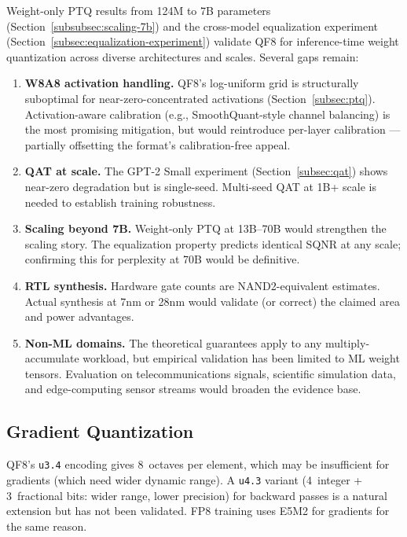 \documentclass[11pt,letterpaper]{article}
\theoremstyle{definition}
\theoremstyle{remark}
\begin{document}
Weight-only PTQ results from 124M to 7B parameters
(Section~\ref{subsubsec:scaling-7b}) and the cross-model equalization experiment
(Section~\ref{subsec:equalization-experiment}) validate QF8 for inference-time
weight quantization across diverse architectures and scales.
Several gaps remain:
\begin{enumerate}[leftmargin=2em]
  \item \textbf{W8A8 activation handling.}
    QF8's log-uniform grid is structurally suboptimal for near-zero-concentrated
    activations (Section~\ref{subsec:ptq}).
    Activation-aware calibration (e.g., SmoothQuant-style channel balancing) is
    the most promising mitigation, but would reintroduce per-layer
    calibration --- partially offsetting the format's calibration-free appeal.
  \item \textbf{QAT at scale.}
    The GPT-2 Small experiment (Section~\ref{subsec:qat}) shows near-zero
    degradation but is single-seed.
    Multi-seed QAT at 1B+ scale is needed to establish training robustness.
  \item \textbf{Scaling beyond 7B.}
    Weight-only PTQ at 13B--70B would strengthen the scaling story.
    The equalization property predicts identical SQNR at any scale; confirming
    this for perplexity at 70B would be definitive.
  \item \textbf{RTL synthesis.}
    Hardware gate counts are NAND2-equivalent estimates.
    Actual synthesis at 7nm or 28nm would validate (or correct) the claimed area
    and power advantages.
  \item \textbf{Non-ML domains.}
    The theoretical guarantees apply to any multiply-accumulate workload, but
    empirical validation has been limited to ML weight tensors.
    Evaluation on telecommunications signals, scientific simulation data, and
    edge-computing sensor streams would broaden the evidence base.
\end{enumerate}

\subsection{Gradient Quantization}

QF8's \texttt{u3.4} encoding gives 8~octaves per element, which may be
insufficient for gradients (which need wider dynamic range).
A \texttt{u4.3} variant (4~integer + 3~fractional bits: wider range, lower
precision) for backward passes is a natural extension but has not been
validated.
FP8 training uses E5M2 for gradients for the same reason.
\end{document}
